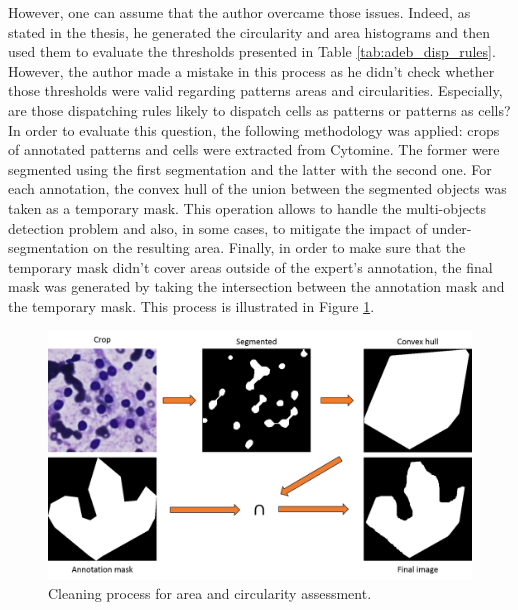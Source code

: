 However, one can assume that the author overcame those issues. Indeed, as stated in the thesis, he generated the circularity and area histograms and then used them to evaluate the thresholds presented in Table \ref{tab:adeb_disp_rules}. However, the author made a mistake in this process as he didn't check whether those thresholds were valid regarding patterns areas and circularities. Especially, are those dispatching rules likely to dispatch cells as patterns or patterns as cells? In order to evaluate this question, the following methodology was applied: crops of annotated patterns and cells were extracted from Cytomine. The former were segmented using the first segmentation and the latter with the second one. For each annotation, the convex hull of the union between the segmented objects was taken as a temporary mask. This operation allows to handle the multi-objects detection problem and also, in some cases, to mitigate the impact of under-segmentation on the resulting area. Finally, in order to make sure that the temporary mask didn't cover areas outside of the expert's annotation, the final mask was generated by taking the intersection between the annotation mask and the temporary mask. This process is illustrated in Figure \ref{fig:annot_cleaning}.

\begin{figure}
	\center
	\includegraphics[scale=0.45]{image/area_annot_cleaning.png}
	\caption{Cleaning process for area and circularity assessment.}
	\label{fig:annot_cleaning}
\end{figure}

